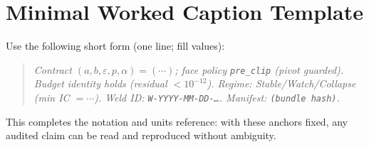 \section{Minimal Worked Caption Template}
\label{apx:caption-template}
Use the following short form (one line; fill values):
\begin{quote}\itshape
Contract \((a,b,\varepsilon,p,\alpha)=(\cdots)\); face policy \texttt{pre\_clip} (pivot guarded).
Budget identity holds (residual \(<10^{-12}\)).
Regime: \emph{Stable/Watch/Collapse} (min IC \(=\cdots\)).
Weld ID: \texttt{W-YYYY-MM-DD-\dots}. Manifest: \texttt{(bundle hash)}.
\end{quote}

\medskip
This completes the notation and units reference: with these anchors fixed, any audited claim can be read and reproduced without ambiguity.

